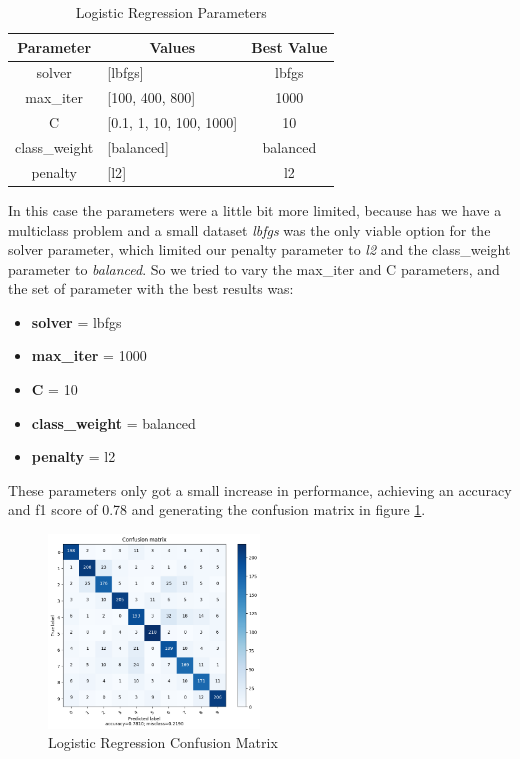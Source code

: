 \documentclass[conference]{IEEEtran}
\begin{document}
\begin{table}[h]
    \centering
    
    \begin{tabular}{|c|l|c|}
    \hline
    \textbf{Parameter} & \multicolumn{1}{c|}{\textbf{Values}}     & \multicolumn{1}{l|}{\textbf{Best Value}} \\ \hline
    solver       & {[}lbfgs{]}                  & lbfgs                                      \\ \hline
    max\_iter          & {[}100, 400, 800{]}                      & 1000                                  \\ \hline
    C        & {[}0.1, 1, 10, 100, 1000{]}                   & 10                                    \\ \hline
    class\_weight  & {[}balanced{]}                           & balanced                                  \\ \hline
    penalty   & {[}l2{]}                            & l2                               \\ \hline
    \end{tabular}
    \caption{Logistic Regression Parameters \label{tab:lg_parameters}}
\end{table}
In this case the parameters were a little bit more limited, because has we have a multiclass problem and a small dataset 
\textit{lbfgs} was the only viable option for the solver parameter, which limited our penalty parameter to \textit{l2} and the class\_weight parameter to \textit{balanced}.
So we tried to vary the max\_iter and C parameters, and the set of parameter with the best results was:
\begin{itemize}
    \item \textbf{solver} = lbfgs
    \item \textbf{max\_iter} = 1000
    \item \textbf{C} = 10
    \item \textbf{class\_weight} = balanced
    \item \textbf{penalty} = l2
\end{itemize}
These parameters only got a small increase in performance, achieving an accuracy and f1 score of 0.78 and generating the confusion
matrix in figure \ref{fig:lg-confusion-matrix}.

\begin{figure}[h]
    \centering
    \includegraphics[width=0.5\textwidth]{assets/lg-confusion-matrix.png}
    \caption{Logistic Regression Confusion Matrix}
    \label{fig:lg-confusion-matrix}
\end{figure}
\end{document}
